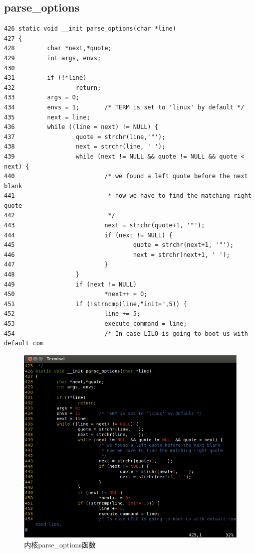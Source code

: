 \subsection{parse\_options}

{\begin{shaded}\begin{verbatim}
426 static void __init parse_options(char *line)
427 {
428         char *next,*quote;
429         int args, envs;
430 
431         if (!*line)
432                 return;
433         args = 0;
434         envs = 1;       /* TERM is set to 'linux' by default */
435         next = line;
436         while ((line = next) != NULL) {
437                 quote = strchr(line,'"');
438                 next = strchr(line, ' ');
439                 while (next != NULL && quote != NULL && quote < next) {
440                         /* we found a left quote before the next blank
441                          * now we have to find the matching right quote
442                          */
443                         next = strchr(quote+1, '"');
444                         if (next != NULL) {
445                                 quote = strchr(next+1, '"');
446                                 next = strchr(next+1, ' ');
447                         }
448                 }
449                 if (next != NULL)
450                         *next++ = 0;
451                 if (!strncmp(line,"init=",5)) {
452                         line += 5;
453                         execute_command = line;
454                         /* In case LILO is going to boot us with default com      
\end{verbatim}\end{shaded}}
\begin{figure}[htbp]
\centering
\includegraphics{./pictures/parse_options.png}
\caption{内核parse\_options函数}
\end{figure}

